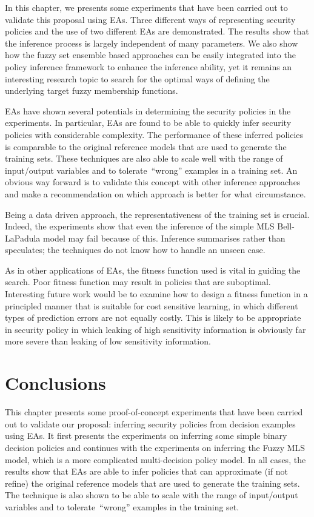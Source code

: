 In this chapter, we presents some experiments that have been carried
out to validate this proposal using EAs. Three different ways of
representing security policies and the use of two different EAs are
demonstrated. The results show that the inference process is largely
independent of many parameters. We also show how the fuzzy set
ensemble based approaches can be easily integrated into the policy
inference framework to enhance the inference ability, yet it remains
an interesting research topic to search for the optimal ways of
defining the underlying target fuzzy membership functions.

EAs have shown several potentials in determining the security policies
in the experiments. In particular, EAs are found to be able to quickly
infer security policies with considerable complexity. The performance
of these inferred policies is comparable to the original reference
models that are used to generate the training sets. These techniques
are also able to scale well with the range of input/output variables
and to tolerate~``wrong'' examples in a training set. An obvious way
forward is to validate this concept with other inference approaches
and make a recommendation on which approach is better for what
circumstance.

Being a data driven approach, the representativeness of the training
set is crucial. Indeed, the experiments show that even the inference
of the simple MLS Bell-LaPadula model may fail because of
this. Inference summarises rather than speculates; the techniques do
not know how to handle an unseen case.

As in other applications of EAs, the fitness function used is vital in
guiding the search. Poor fitness function may result in policies that
are suboptimal. Interesting future work would be to examine how to
design a fitness function in a principled manner that is suitable for
cost sensitive learning, in which different types of prediction errors
are not equally costly. This is likely to be appropriate in security
policy in which leaking of high sensitivity information is obviously
far more severe than leaking of low sensitivity information.

\section{Conclusions}
\label{sec:conclusion5}
This chapter presents some proof-of-concept experiments that have been
carried out to validate our proposal: inferring security policies from
decision examples using EAs. It first presents the experiments on
inferring some simple binary decision policies and continues with the
experiments on inferring the Fuzzy MLS model, which is a more
complicated multi-decision policy model. In all cases, the results
show that EAs are able to infer policies that can approximate (if not
refine) the original reference models that are used to generate the
training sets. The technique is also shown to be able to scale with
the range of input/output variables and to tolerate~``wrong'' examples
in the training set.

